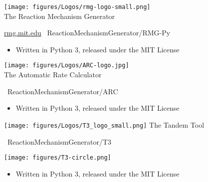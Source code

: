 \begin{frame}{
 \hspace{-5mm}
 \texttt{[image: figures/Logos/rmg-logo-small.png]}\\
 The Reaction Mechanism Generator
}

\url{rmg.mit.edu}
\hspace{10mm}
\ghinlinelogo\ ReactionMechanismGenerator/RMG-Py

\vspace{5mm}

\begin{itemize}
 \item Written in Python 3, released under the MIT License
\end{itemize}

\end{frame}

\begin{frame}{
 \hspace{-5mm}
 \texttt{[image: figures/Logos/ARC-logo.jpg]}\\
 The Automatic Rate Calculator
}


\ghinlinelogo\ ReactionMechanismGenerator/ARC

\vspace{5mm}

\begin{itemize}
 \item Written in Python 3, released under the MIT License
\end{itemize}

\end{frame}

\begin{frame}{
 \hspace{-5mm}
 \texttt{[image: figures/Logos/T3\_logo\_small.png]}
 The Tandem Tool
}

\ghinlinelogo\ ReactionMechanismGenerator/T3

{
\centering
\texttt{[image: figures/T3-circle.png]}
}

\begin{itemize}
 \item Written in Python 3, released under the MIT License
\end{itemize}

\end{frame}

